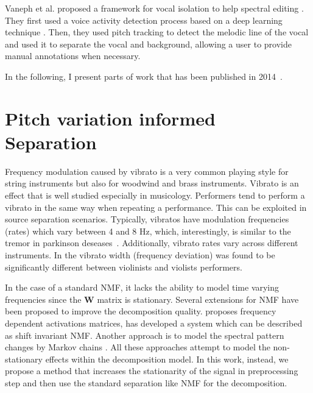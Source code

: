 Vaneph et al. proposed a framework for vocal isolation to help spectral editing \cite{vaneph16}. They first used a voice activity detection process based on a deep learning technique \cite{leglaive15}. Then, they used pitch tracking to detect the melodic line of the vocal and used it to separate the vocal and background, allowing a user to provide manual annotations when necessary.
\par
In the following, I present parts of work that has been published in 2014~\cite{stoeter14}.

\section{Pitch variation informed Separation}
\label{sub:frequency_modulation}



Frequency modulation caused by vibrato is a very common playing style for string instruments but also for woodwind and brass instruments.
Vibrato is an effect that is well studied especially in musicology.
Performers tend to perform a vibrato in the same way when repeating a performance.
This can be exploited in source separation scenarios.
Typically, vibratos have modulation frequencies (rates) which vary between 4 and 8 Hz, which, interestingly, is similar to the tremor in parkinson deseases~\cite{fletcher01}.
Additionally, vibrato rates vary across different instruments.
In \cite{macleod06} the vibrato width (frequency deviation) was found to be significantly different between violinists and violists performers.

In the case of a standard NMF, it lacks the ability to model time varying frequencies since the $\mathbf{W}$ matrix is stationary.
Several extensions for NMF have been proposed to improve the decomposition quality.
\cite{hennequin11} proposes frequency dependent activations matrices, \cite{smaragdis08} has developed a system which can be described as shift invariant NMF.
Another approach is to model the spectral pattern changes by Markov chains \cite{nakano10}. All these approaches attempt to model the non-stationary effects within the decomposition model.
In this work, instead, we propose a method that increases the stationarity of the signal in preprocessing step and then use the standard separation like NMF for the decomposition.\\

